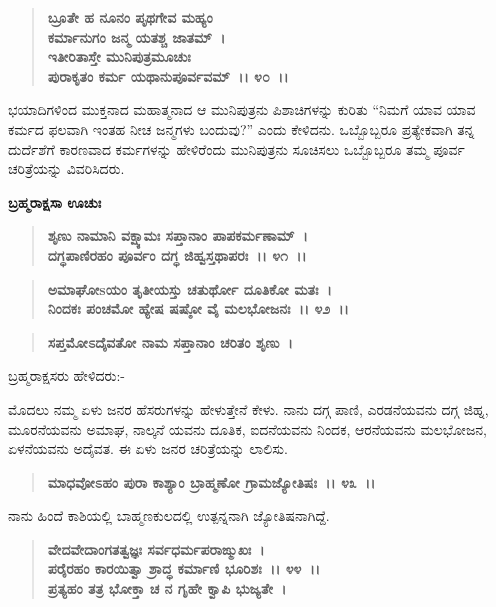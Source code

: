 \begin{verse}
\textbf{ಬ್ರೂತೇ ಹ ನೂನಂ ಪೃಥಗೇವ ಮಹ್ಯಂ} \\\textbf{ಕರ್ಮಾನುಗಂ ಜನ್ಮ ಯತಶ್ಚ ಜಾತಮ್~।}\\\textbf{ಇತೀರಿತಾಸ್ತೇ ಮುನಿಪುತ್ರಮೂಚುಃ} \\\textbf{ಪುರಾಕೃತಂ ಕರ್ಮ ಯಥಾನುಪೂರ್ವವಮ್~।। ೪೦~।।}
\end{verse}

ಭಯಾದಿಗಳಿಂದ ಮುಕ್ತನಾದ ಮಹಾತ್ಮನಾದ ಆ ಮುನಿಪುತ್ರನು ಪಿಶಾಚಿಗಳನ್ನು ಕುರಿತು “ನಿಮಗೆ ಯಾವ ಯಾವ ಕರ್ಮದ ಫಲವಾಗಿ ಇಂತಹ ನೀಚ ಜನ್ಮಗಳು ಬಂದುವು?” ಎಂದು ಕೇಳಿದನು. ಒಬ್ಬೊಬ್ಬರೂ ಪ್ರತ್ಯೇಕವಾಗಿ ತನ್ನ ದುರ್ದೆಶೆಗೆ ಕಾರಣವಾದ ಕರ್ಮಗಳನ್ನು ಹೇಳಿರೆಂದು ಮುನಿಪುತ್ರನು ಸೂಚಿಸಲು ಒಬ್ಬೊಬ್ಬರೂ ತಮ್ಮ ಪೂರ್ವ ಚರಿತ್ರೆಯನ್ನು ವಿವರಿಸಿದರು.

\begin{flushleft}
\textbf{ಬ್ರಹ್ಮರಾಕ್ಷಸಾ ಊಚುಃ\enginline{-}}
\end{flushleft}

\begin{verse}
\textbf{ಶೃಣು ನಾಮಾನಿ ವಕ್ಷ್ಯಾಮಃ ಸಪ್ತಾನಾಂ ಪಾಪಕರ್ಮಣಾಮ್~।}\\\textbf{ದಗ್ಧಪಾಣಿರಹಂ ಪೂರ್ವಂ ದಗ್ಧ ಜಿಹ್ವಸ್ತಥಾಪರಃ~।। ೪೧~।। }
\end{verse}

\begin{verse}
\textbf{ಅಮಾಘೋsಯಂ ತೃತೀಯಸ್ತು ಚತುರ್ಥೋ ದೂತಿಕೋ ಮತಃ~।}\\\textbf{ನಿಂದಕಃ ಪಂಚಮೋ ಹ್ಯೇಷ ಷಷ್ಠೋ ವೈ ಮಲಭೋಜನಃ~।। ೪೨~।।}
\end{verse}

\begin{verse}
\textbf{ಸಪ್ತಮೋಽದೈವತೋ ನಾಮ ಸಪ್ತಾನಾಂ ಚರಿತಂ ಶೃಣು~।}
\end{verse}

\noindent
 ಬ್ರಹ್ಮರಾಕ್ಷಸರು ಹೇಳಿದರು:-

ಮೊದಲು ನಮ್ಮ ಏಳು ಜನರ ಹೆಸರುಗಳನ್ನು ಹೇಳುತ್ತೇನೆ ಕೇಳು. ನಾನು ದಗ್ಗ ಪಾಣಿ, ಎರಡನೆಯವನು ದಗ್ಗ ಜಿಹ್ನ, ಮೂರನೆಯವನು ಅಮಾಘ, ನಾಲ್ಕನೆ ಯವನು ದೂತಿಕ, ಐದನೆಯವನು ನಿಂದಕ, ಆರನೆಯವನು ಮಲಭೋಜನ, ಏಳನೆಯವನು ಅದೈವತ. ಈ ಏಳು ಜನರ ಚರಿತ್ರೆಯನ್ನು ಲಾಲಿಸು.

\begin{verse}
\textbf{ಮಾಧವೋಽಹಂ ಪುರಾ ಕಾಶ್ಯಾಂ ಬ್ರಾಹ್ಮಣೋ ಗ್ರಾಮಜ್ಯೋತಿಷಃ~।। ೪೩~।।}
\end{verse}

ನಾನು ಹಿಂದೆ ಕಾಶಿಯಲ್ಲಿ ಬಾಹ್ಮಣಕುಲದಲ್ಲಿ ಉತ್ಪನ್ನನಾಗಿ ಜ್ಯೋತಿಷನಾಗಿದ್ದೆ.

\begin{verse}
\textbf{ವೇದವೇದಾಂಗತತ್ವಜ್ಞಃ ಸರ್ವಧರ್ಮಪರಾಙ್ಮುಖಃ~।}\\\textbf{ಪರೈರಹಂ ಕಾರಯಿತ್ವಾ ಶ್ರಾದ್ಧ ಕರ್ಮಾಣಿ ಭೂರಿಶಃ~।। ೪೪~।। }\\\textbf{ಪ್ರತ್ಯಹಂ ತತ್ರ ಭೋಕ್ತಾ ಚ ನ ಗೃಹೇ ಕ್ವಾಪಿ ಭುಜ್ಯತೇ~।}
\end{verse}

